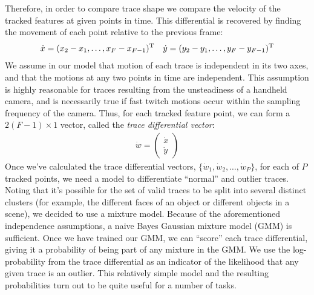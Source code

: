 Therefore, in order to compare trace shape we compare the velocity of the
tracked features at given points in time.
This differential is recovered by finding the movement of each point relative
to the previous frame:
\begin{align*}
\dot x = (x_2-x_1, \ldots, x_F-x_{F-1})^{\rm T} && \dot y = (y_2-y_1, \ldots, y_F-y_{F-1})^{\rm T}
\end{align*}
We assume in our model that motion of each trace is independent in its two
axes, and that the motions at any two points in time are independent.  This
assumption is highly reasonable for traces resulting from the unsteadiness of a
handheld camera, and is necessarily true if fast twitch motions occur within
the sampling frequency of the camera.  Thus, for each tracked feature point, we
can form a $2(F-1)\times 1$ vector, called the {\it trace differential vector}:
\begin{align*}
\dot w = \left( \begin{array}{c}\dot x \\ \dot y\end{array} \right)
\end{align*}
Once we've calculated the trace differential vectors, $\{\dot w_1, \dot w_2,
\ldots , \dot w_P\}$, for each of $P$ tracked points, we need a model to
differentiate ``normal'' and outlier traces.
Noting that it's possible for the set of valid traces to be split into several
distinct clusters (for example, the different faces of an object or different
objects in a scene), we decided to use a mixture model.  Because of the
aforementioned independence assumptions, a naive Bayes Gaussian mixture model (GMM)
is sufficient.  
Once we have trained our GMM, we can ``score'' each trace differential, giving it a
probability of being part of any mixture in the GMM.  We use the
log-probability from the trace differential as an indicator of the likelihood
that any given trace is an outlier.  This relatively simple model and the
resulting probabilities turn out to be quite useful for a number of tasks.


